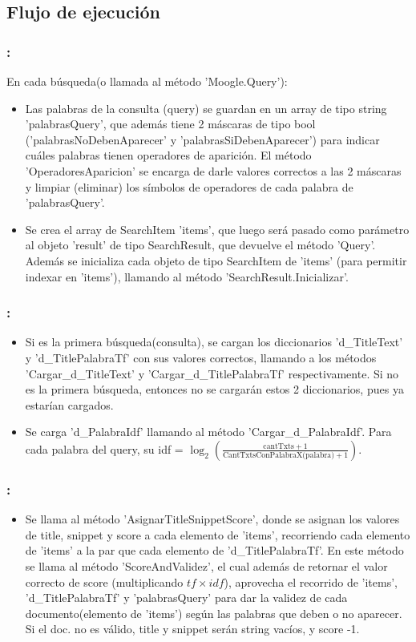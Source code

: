 \documentclass{beamer}
\begin{document}
\subsection{Flujo de ejecución}\label{sub:fluj}
\begin{frame}
  \frametitle{\Large \insertsection : \insertsubsection} 
  En cada búsqueda(o llamada al método 'Moogle.Query'):
\begin{itemize}
    \item Las palabras de la consulta (query) se guardan en un array de tipo string 'palabrasQuery', que además tiene 2 
    máscaras de tipo bool ('palabrasNoDebenAparecer' y 'palabrasSiDebenAparecer') para indicar cuáles palabras tienen 
    operadores de aparición. El método 'OperadoresAparicion' se encarga de darle valores correctos a las 2 máscaras y 
    limpiar (eliminar) los símbolos de operadores de cada palabra de 'palabrasQuery'.
    \pause
    \item Se crea el array de SearchItem 'items', que luego será pasado como parámetro al objeto 'result' de tipo 
    SearchResult, que devuelve el método 'Query'. Además se inicializa cada objeto de tipo SearchItem de 'items' 
    (para permitir indexar en 'items'), llamando al método 'SearchResult.Inicializar'.
\end{itemize}    
\end{frame}
\begin{frame}
  \frametitle{\Large \insertsection : \insertsubsection} 
\begin{itemize}
   \item Si es la primera búsqueda(consulta), se cargan los diccionarios 'd\_TitleText' y 'd\_TitlePalabraTf' con sus 
   valores correctos, llamando a los métodos 'Cargar\_d\_TitleText' y 'Cargar\_d\_TitlePalabraTf' respectivamente. 
   Si no es la primera búsqueda, entonces no se cargarán estos 2 diccionarios, pues ya estarían cargados. 
   \pause
    \item Se carga 'd\_PalabraIdf' llamando al método 'Cargar\_d\_PalabraIdf'. Para cada palabra del query, su
     idf = \(\log_2 \left( \frac{{\text{{cantTxts}} +1}}{{\text{{CantTxtsConPalabraX(palabra)}} +1}} \right)\).
\end{itemize}
\end{frame}
\begin{frame}
  \frametitle{\Large \insertsection : \insertsubsection} 
\begin{itemize}
    \item Se llama al método 'AsignarTitleSnippetScore', donde se asignan los valores de title, snippet y score a cada
     elemento de 'items', recorriendo cada elemento de 'items' a la par que cada elemento de 'd\_TitlePalabraTf'. 
     En este método se llama al método 'ScoreAndValidez', el cual además de retornar el valor correcto de 
     score (multiplicando $tf\times idf$), aprovecha el recorrido de 'items', 'd\_TitlePalabraTf' y 'palabrasQuery' para 
     dar la validez de cada documento(elemento de 'items') según las palabras que deben o no aparecer. Si el doc. no 
     es válido, title y snippet serán string vacíos, y score -1.
\end{itemize}
\end{frame}
\end{document}
